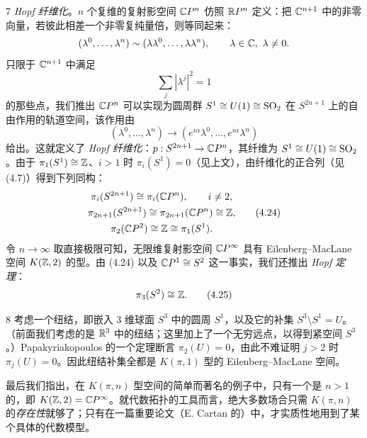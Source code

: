 \begin{example}{7}
\emph{Hopf 纤维化}。$n$ 个复维的复射影空间 $\mathbb{C}P^n$ 仿照 $\mathbb{R}P^n$ 定义：把 $\mathbb{C}^{n+1}$ 中的非零向量，若彼此相差一个非零复纯量倍，则等同起来：
\[
  (\lambda^0,\dots,\lambda^n)\sim(\lambda\lambda^0,\dots,\lambda\lambda^n),
  \qquad \lambda\in\mathbb{C},\ \lambda\ne0.
\]
只限于 $\mathbb{C}^{n+1}$ 中满足
\[
  \sum_j|\lambda^j|^2=1
\]
的那些点，我们推出 $\mathbb{C}P^n$ 可以实现为圆周群 $S^1\cong U(1)\cong\mathrm{SO}_2$ 在 $S^{2n+1}$ 上的自由作用的轨道空间，该作用由
\[
  (\lambda^0,\dots,\lambda^n)\to(e^{i\alpha}\lambda^0,\dots,e^{i\alpha}\lambda^n)
\]
给出。这就定义了 \emph{Hopf 纤维化}：$p:S^{2n+1}\to\mathbb{C}P^n$，其纤维为 $S^1\cong U(1)\cong\mathrm{SO}_2$。由于 $\pi_1(S^1)\cong\mathbb{Z}$、$i>1$ 时 $\pi_i(S^1)=0$（见上文），由纤维化的正合列（见 (4.7)）得到下列同构：
\begin{equation}
  \begin{gathered}
    \pi_i(S^{2n+1})\cong\pi_i(\mathbb{C}P^n),\qquad i\ne2,\\
    \pi_{2n+1}(S^{2n+1})\cong\pi_{2n+1}(\mathbb{C}P^n)\cong\mathbb{Z},\\
    \pi_2(\mathbb{C}P^2)\cong\mathbb{Z}\cong\pi_1(S^1).
  \end{gathered}
  \tag{4.24}
\end{equation}
令 $n\to\infty$ 取直接极限可知，无限维复射影空间 $\mathbb{C}P^\infty$ 具有 Eilenberg--MacLane 空间 $K(\mathbb{Z},2)$ 的型。由 (4.24) 以及 $\mathbb{C}P^1\cong S^2$ 这一事实，我们还推出 \emph{Hopf 定理}：
\begin{equation}
  \pi_3(S^2)\cong\mathbb{Z}. \tag{4.25}
\end{equation}
\end{example}

\begin{example}{8}
考虑一个纽结，即嵌入 3 维球面 $S^3$ 中的圆周 $S^1$，以及它的补集 $S^3\setminus S^1=U$。（前面我们考虑的是 $\mathbb{R}^3$ 中的纽结；这里加上了一个无穷远点，以得到紧空间 $S^3$。）Papakyriakopoulos 的一个定理断言 $\pi_2(U)=0$，由此不难证明 $j>2$ 时 $\pi_j(U)=0$。因此纽结补集全都是 $K(\pi,1)$ 型的 Eilenberg--MacLane 空间。
\end{example}

最后我们指出，在 $K(\pi,n)$ 型空间的简单而著名的例子中，只有一个是 $n>1$ 的，即 $K(\mathbb{Z},2)=\mathbb{C}P^\infty$。就代数拓扑的工具而言，绝大多数场合只需 $K(\pi,n)$ 的\emph{存在性}就够了；只有在一篇重要论文（E. Cartan 的）中，才实质性地用到了某个具体的代数模型。
